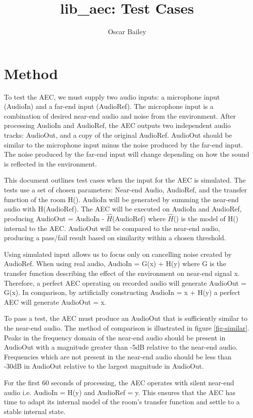 \documentclass[a4paper,10pt]{article}
\title{lib\_aec: Test Cases}
\author{Oscar Bailey}
\begin{document}
\maketitle

\section{Method}

To test the AEC, we must supply two audio inputs: a microphone input (AudioIn)
and a far-end input (AudioRef). The microphone input is a combination of desired
near-end audio and noise from the environment. After processing AudioIn and
AudioRef, the AEC outputs two independent audio tracks: AudioOut, and a copy of
the original AudioRef. AudioOut should be similar to the microphone input minus
the noise produced by the far-end input. The noise produced by the far-end input
will change depending on how the sound is reflected in the environment.

This document outlines test cases when the input for the AEC is simulated.  The
tests use a set of chosen parameters: Near-end Audio, AudioRef, and the transfer
function of the room H(). AudioIn will be generated by summing the near-end
audio with H(AudioRef). The AEC will be executed on AudioIn and AudioRef,
producing AudioOut = AudioIn - $\hat{H}$(AudioRef) where $\hat{H}$() is the
model of H() internal to the AEC. AudioOut will be compared to the near-end
audio, producing a pass/fail result based on similarity within a chosen
threshold.

Using simulated input allows us to focus only on cancelling noise created by
AudioRef. When using real audio, AudioIn = G(x) + H(y) where G is the transfer
function describing the effect of the environment on near-end signal x.
Therefore, a perfect AEC operating on recorded audio will generate AudioOut =
G(x). In comparison, by artificially constructing AudioIn = x + H(y) a perfect
AEC will generate AudioOut = x.

To pass a test, the AEC must produce an AudioOut that is sufficiently similar to
the near-end audio. The method of comparison is illustrated in figure
\ref{fig-similar}. Peaks in the frequency domain of the near-end audio should be
present in AudioOut with a magnitude greater than -5dB relative to the near-end
audio. Frequencies which are not present in the near-end audio should be less
than -30dB in AudioOut relative to the largest magnitude in AudioOut.

For the first 60 seconds of processing, the AEC operates with silent near-end
audio i.e. AudioIn = H(y) and AudioRef = y. This ensures that the AEC has
time to adapt its internal model of the room's transfer function and settle to a
stable internal state.
\end{document}
